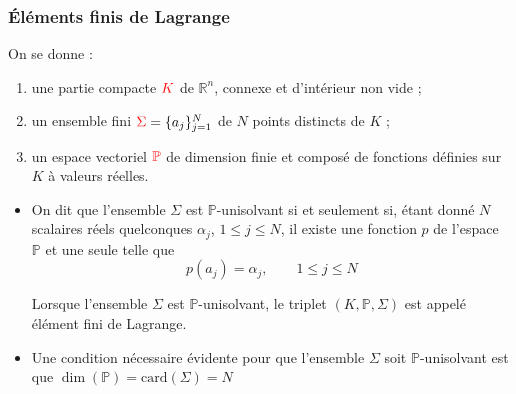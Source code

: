 \documentclass{beamer}
\begin{document}
\begin{frame}
\frametitle{Éléments finis de Lagrange}
  On se donne :
  \begin{enumerate}
  \item une partie compacte ${\color{red} K}$ de $\mathbb{R}^n$, connexe et d'intérieur non vide ; 
  \item un ensemble fini ${\color{red}\Sigma} =\{a_j\}_{j=1}^N$ de $N$ points distincts de $K$ ;
  \item un espace vectoriel ${\color{red}\mathbb{P}}$ de dimension finie et composé de fonctions définies 
sur $K$ à valeurs réelles.
  \end{enumerate}  
  \begin{itemize}
\item On dit que l'ensemble $\Sigma$ est $\mathbb{P}$-unisolvant si et seulement si, étant donné $N$ scalaires réels quelconques $\alpha_j$, $1\leq j \leq N$, il existe une fonction $p$ de l'espace $\mathbb{P}$ et une seule telle que
                          \begin{equation}
                          p(a_j)=\alpha_j,\qquad 1\leq j \leq N
                          \end{equation}

Lorsque l'ensemble $\Sigma$ est $\mathbb{P}$-unisolvant, le triplet $(K, \mathbb{P}, \Sigma)$ est appelé  {\color{red}élément fini de Lagrange}.
\item Une condition nécessaire évidente pour que l'ensemble $\Sigma$ soit 
$\mathbb{P}$-unisolvant est que $\dim(\mathbb{P})=\mbox{card}(\Sigma)=N$
  \end{itemize}
\end{frame}
\end{document}
